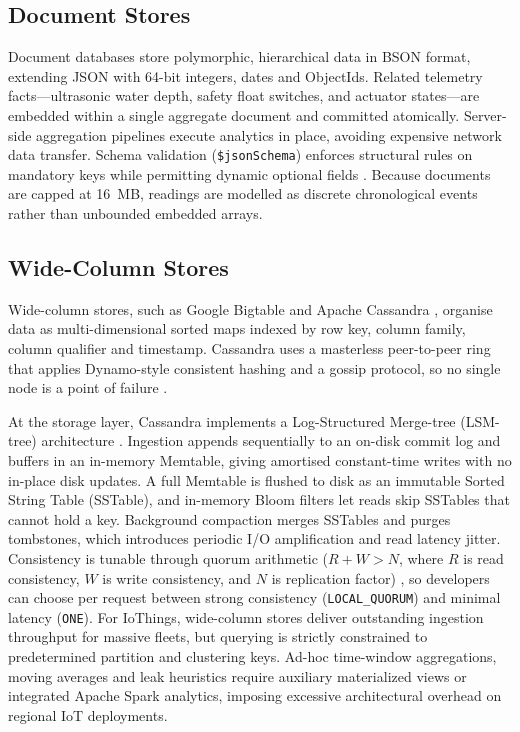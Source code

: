 \documentclass[11pt,a4paper]{article}
\begin{document}
\subsection{Document Stores}
Document databases store polymorphic, hierarchical data in BSON format, extending JSON with 64-bit integers, dates and ObjectIds. Related telemetry facts---ultrasonic water depth, safety float switches, and actuator states---are embedded within a single aggregate document and committed atomically. Server-side aggregation pipelines execute analytics in place, avoiding expensive network data transfer. Schema validation (\texttt{\$jsonSchema}) enforces structural rules on mandatory keys while permitting dynamic optional fields \citep{mongoVal}. Because documents are capped at 16~MB, readings are modelled as discrete chronological events rather than unbounded embedded arrays.

\subsection{Wide-Column Stores}
Wide-column stores, such as Google Bigtable \citep{chang2008} and Apache Cassandra \citep{lakshman2010}, organise data as multi-dimensional sorted maps indexed by row key, column family, column qualifier and timestamp. Cassandra uses a masterless peer-to-peer ring that applies Dynamo-style consistent hashing and a gossip protocol, so no single node is a point of failure \citep{lakshman2010,decandia2007}.

At the storage layer, Cassandra implements a Log-Structured Merge-tree (LSM-tree) architecture \citep{oneil1996}. Ingestion appends sequentially to an on-disk commit log and buffers in an in-memory Memtable, giving amortised constant-time writes with no in-place disk updates. A full Memtable is flushed to disk as an immutable Sorted String Table (SSTable), and in-memory Bloom filters let reads skip SSTables that cannot hold a key. Background compaction merges SSTables and purges tombstones, which introduces periodic I/O amplification and read latency jitter. Consistency is tunable through quorum arithmetic ($R + W > N$, where $R$ is read consistency, $W$ is write consistency, and $N$ is replication factor) \citep{decandia2007}, so developers can choose per request between strong consistency (\texttt{LOCAL\_QUORUM}) and minimal latency (\texttt{ONE}). For IoThings, wide-column stores deliver outstanding ingestion throughput for massive fleets, but querying is strictly constrained to predetermined partition and clustering keys. Ad-hoc time-window aggregations, moving averages and leak heuristics require auxiliary materialized views or integrated Apache Spark analytics, imposing excessive architectural overhead on regional IoT deployments.
\end{document}

